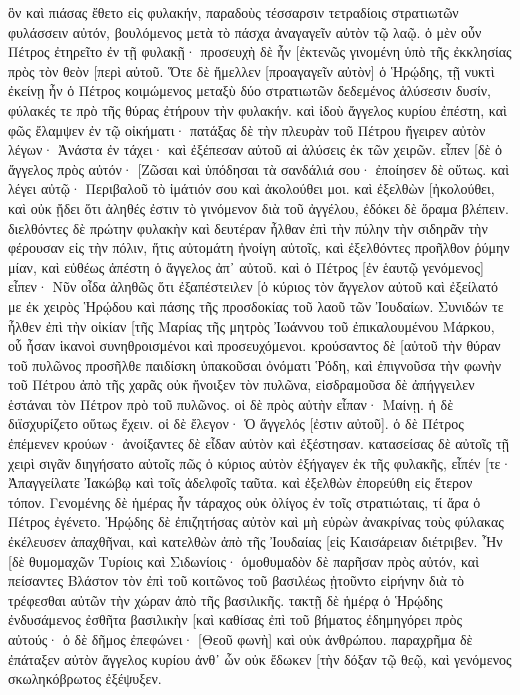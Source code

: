 ὃν καὶ πιάσας ἔθετο εἰς φυλακήν, παραδοὺς τέσσαρσιν τετραδίοις στρατιωτῶν φυλάσσειν αὐτόν, βουλόμενος μετὰ τὸ πάσχα ἀναγαγεῖν αὐτὸν τῷ λαῷ. 
ὁ μὲν οὖν Πέτρος ἐτηρεῖτο ἐν τῇ φυλακῇ· προσευχὴ δὲ ἦν [ἐκτενῶς γινομένη ὑπὸ τῆς ἐκκλησίας πρὸς τὸν θεὸν [περὶ αὐτοῦ. 
Ὅτε δὲ ἤμελλεν [προαγαγεῖν αὐτὸν] ὁ Ἡρῴδης, τῇ νυκτὶ ἐκείνῃ ἦν ὁ Πέτρος κοιμώμενος μεταξὺ δύο στρατιωτῶν δεδεμένος ἁλύσεσιν δυσίν, φύλακές τε πρὸ τῆς θύρας ἐτήρουν τὴν φυλακήν. 
καὶ ἰδοὺ ἄγγελος κυρίου ἐπέστη, καὶ φῶς ἔλαμψεν ἐν τῷ οἰκήματι· πατάξας δὲ τὴν πλευρὰν τοῦ Πέτρου ἤγειρεν αὐτὸν λέγων· Ἀνάστα ἐν τάχει· καὶ ἐξέπεσαν αὐτοῦ αἱ ἁλύσεις ἐκ τῶν χειρῶν. 
εἶπεν [δὲ ὁ ἄγγελος πρὸς αὐτόν· [Ζῶσαι καὶ ὑπόδησαι τὰ σανδάλιά σου· ἐποίησεν δὲ οὕτως. καὶ λέγει αὐτῷ· Περιβαλοῦ τὸ ἱμάτιόν σου καὶ ἀκολούθει μοι. 
καὶ ἐξελθὼν [ἠκολούθει, καὶ οὐκ ᾔδει ὅτι ἀληθές ἐστιν τὸ γινόμενον διὰ τοῦ ἀγγέλου, ἐδόκει δὲ ὅραμα βλέπειν. 
διελθόντες δὲ πρώτην φυλακὴν καὶ δευτέραν ἦλθαν ἐπὶ τὴν πύλην τὴν σιδηρᾶν τὴν φέρουσαν εἰς τὴν πόλιν, ἥτις αὐτομάτη ἠνοίγη αὐτοῖς, καὶ ἐξελθόντες προῆλθον ῥύμην μίαν, καὶ εὐθέως ἀπέστη ὁ ἄγγελος ἀπ᾽ αὐτοῦ. 
καὶ ὁ Πέτρος [ἐν ἑαυτῷ γενόμενος] εἶπεν· Νῦν οἶδα ἀληθῶς ὅτι ἐξαπέστειλεν [ὁ κύριος τὸν ἄγγελον αὐτοῦ καὶ ἐξείλατό με ἐκ χειρὸς Ἡρῴδου καὶ πάσης τῆς προσδοκίας τοῦ λαοῦ τῶν Ἰουδαίων. 
Συνιδών τε ἦλθεν ἐπὶ τὴν οἰκίαν [τῆς Μαρίας τῆς μητρὸς Ἰωάννου τοῦ ἐπικαλουμένου Μάρκου, οὗ ἦσαν ἱκανοὶ συνηθροισμένοι καὶ προσευχόμενοι. 
κρούσαντος δὲ [αὐτοῦ τὴν θύραν τοῦ πυλῶνος προσῆλθε παιδίσκη ὑπακοῦσαι ὀνόματι Ῥόδη, 
καὶ ἐπιγνοῦσα τὴν φωνὴν τοῦ Πέτρου ἀπὸ τῆς χαρᾶς οὐκ ἤνοιξεν τὸν πυλῶνα, εἰσδραμοῦσα δὲ ἀπήγγειλεν ἑστάναι τὸν Πέτρον πρὸ τοῦ πυλῶνος. 
οἱ δὲ πρὸς αὐτὴν εἶπαν· Μαίνῃ. ἡ δὲ διϊσχυρίζετο οὕτως ἔχειν. οἱ δὲ ἔλεγον· Ὁ ἄγγελός [ἐστιν αὐτοῦ]. 
ὁ δὲ Πέτρος ἐπέμενεν κρούων· ἀνοίξαντες δὲ εἶδαν αὐτὸν καὶ ἐξέστησαν. 
κατασείσας δὲ αὐτοῖς τῇ χειρὶ σιγᾶν διηγήσατο αὐτοῖς πῶς ὁ κύριος αὐτὸν ἐξήγαγεν ἐκ τῆς φυλακῆς, εἶπέν [τε· Ἀπαγγείλατε Ἰακώβῳ καὶ τοῖς ἀδελφοῖς ταῦτα. καὶ ἐξελθὼν ἐπορεύθη εἰς ἕτερον τόπον. 
Γενομένης δὲ ἡμέρας ἦν τάραχος οὐκ ὀλίγος ἐν τοῖς στρατιώταις, τί ἄρα ὁ Πέτρος ἐγένετο. 
Ἡρῴδης δὲ ἐπιζητήσας αὐτὸν καὶ μὴ εὑρὼν ἀνακρίνας τοὺς φύλακας ἐκέλευσεν ἀπαχθῆναι, καὶ κατελθὼν ἀπὸ τῆς Ἰουδαίας [εἰς Καισάρειαν διέτριβεν. 
Ἦν [δὲ θυμομαχῶν Τυρίοις καὶ Σιδωνίοις· ὁμοθυμαδὸν δὲ παρῆσαν πρὸς αὐτόν, καὶ πείσαντες Βλάστον τὸν ἐπὶ τοῦ κοιτῶνος τοῦ βασιλέως ᾐτοῦντο εἰρήνην διὰ τὸ τρέφεσθαι αὐτῶν τὴν χώραν ἀπὸ τῆς βασιλικῆς. 
τακτῇ δὲ ἡμέρᾳ ὁ Ἡρῴδης ἐνδυσάμενος ἐσθῆτα βασιλικὴν [καὶ καθίσας ἐπὶ τοῦ βήματος ἐδημηγόρει πρὸς αὐτούς· 
ὁ δὲ δῆμος ἐπεφώνει· [Θεοῦ φωνὴ] καὶ οὐκ ἀνθρώπου. 
παραχρῆμα δὲ ἐπάταξεν αὐτὸν ἄγγελος κυρίου ἀνθ᾽ ὧν οὐκ ἔδωκεν [τὴν δόξαν τῷ θεῷ, καὶ γενόμενος σκωληκόβρωτος ἐξέψυξεν. 
